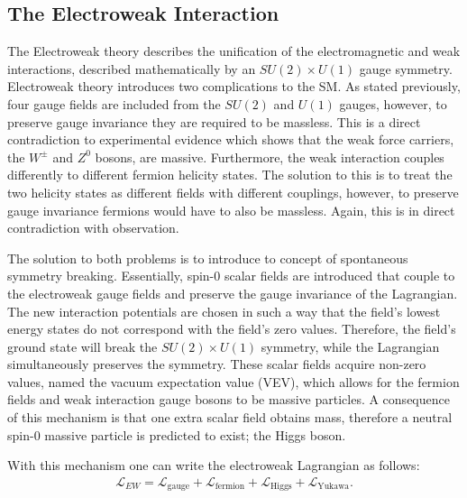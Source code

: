 \documentclass[12pt, oneside]{article}   	%
\begin{document}
\subsection{The Electroweak Interaction}
The Electroweak theory \cite{glashow1959renormalizability} describes the unification of the electromagnetic and weak interactions, described mathematically by an $SU(2) \times U(1)$ gauge symmetry.
Electroweak theory introduces two complications to the SM.
As stated previously, four gauge fields are included from the $SU(2)$ and $U(1)$ gauges, however, to preserve gauge invariance they are required to be massless.
This is a direct contradiction to experimental evidence which shows that the weak force carriers, the $W^{\pm}$ and $Z^{0}$ bosons, are massive.
Furthermore, the weak interaction couples differently to different fermion helicity states.
The solution to this is to treat the two helicity states as different fields with different couplings, however, to preserve gauge invariance fermions would have to also be massless.
Again, this is in direct contradiction with observation.

The solution to both problems is to introduce to concept of spontaneous symmetry breaking. 
Essentially, spin-0 scalar fields are introduced that couple to the electroweak gauge fields and preserve the gauge invariance of the Lagrangian.
The new interaction potentials are chosen in such a way that the field's lowest energy states do not correspond with the field's zero values.
Therefore, the field's ground state will break the $SU(2) \times U(1)$ symmetry, while the Lagrangian simultaneously preserves the symmetry.
These scalar fields acquire non-zero values, named the vacuum expectation value (VEV), which allows for the fermion fields and weak interaction gauge bosons to be massive particles.
A consequence of this mechanism is that one extra scalar field obtains mass, therefore a neutral spin-0 massive particle is predicted to exist; the Higgs boson.

With this mechanism one can write the electroweak Lagrangian as follows:
\begin{align}
\mathcal{L}_{EW} = \mathcal{L}_{\textrm{gauge}} + \mathcal{L}_{\textrm{fermion}} + \mathcal{L}_{\textrm{Higgs}} + \mathcal{L}_{\textrm{Yukawa}}.
\end{align}
\end{document}

